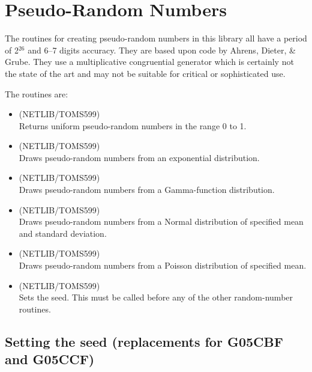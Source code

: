 \section{Pseudo-Random Numbers}

   The routines for creating pseudo-random numbers in this library all
   have a period of 2$^{26}$ and 6--7 digits accuracy.  They are based
   upon code by Ahrens, Dieter, \& Grube.  They use a multiplicative
   congruential generator which is certainly not the state of the art
   and may not be suitable for critical or sophisticated use.

The routines are:

\begin{itemize}

\item {} (NETLIB/TOMS599)\ \\
   Returns uniform pseudo-random numbers in the range 0 to 1.

\item {} (NETLIB/TOMS599)\ \\
   Draws pseudo-random numbers from an exponential distribution.

\item {} (NETLIB/TOMS599)\ \\
   Draws pseudo-random numbers from a Gamma-function distribution.

\item {} (NETLIB/TOMS599)\ \\
   Draws pseudo-random numbers from a Normal distribution of specified
   mean and standard deviation.

\item {} (NETLIB/TOMS599)\ \\
   Draws pseudo-random numbers from a Poisson distribution of
   specified mean.

\item {} (NETLIB/TOMS599)\ \\
   Sets the seed.  This must be called before any of the other
   random-number routines.

\end{itemize}

\subsection{Setting the seed (replacements for G05CBF and G05CCF)}
\label{se:seeding}

